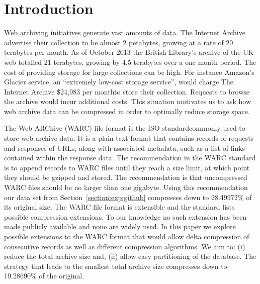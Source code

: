 \documentclass[11pt]{article}
\begin{document}
\section{Introduction}

Web archiving initiatives generate vast amounts of data. The Internet Archive advertise their collection to be almost 2 petabytes, growing at a rate of 20 terabytes per month\footnotemark. As of October 2013 the British Library's archive of the UK web totalled 21 terabytes, growing by 4.5 terabytes over a one month period\footnotemark. The cost of providing storage for large collections can be high. For instance Amazon's Glacier service, an ``extremely low-cost storage service'', would charge The Internet Archive \$24,983 per month\footnotemark to store their collection. Requests to browse the archive would incur additional costs. This situation motivates us to ask how web archive data can be compressed in order to optimally reduce storage space.

The Web ARChive (WARC) file format is the ISO standard\footnotemark commonly used to store web archive data. It is a plain text format that contains records of requests and responses of URLs, along with associated metadata, such as a list of links contained within the response data. The recommendation in the WARC standard is to append records to WARC files until they reach a size limit, at which point they should be gzipped and stored. The recommendation is that uncompressed WARC files should be no larger than one gigabyte. Using this recommendation our data set from Section~\ref{section:exp:github} compresses down to 28.49972\% of its original size. The WARC file format is extensible and the standard lists possible compression extensions. To our knowledge no such extension has been made publicly available and none are widely used. In this paper we explore possible extensions to the WARC format that would allow delta compression of consecutive records as well as different compression algorithms. We aim to: (i) reduce the total archive size and, (ii) allow easy partitioning of the database. The strategy that leads to the smallest total archive size compresses down to 19.28690\% of the original.

\end{document}
